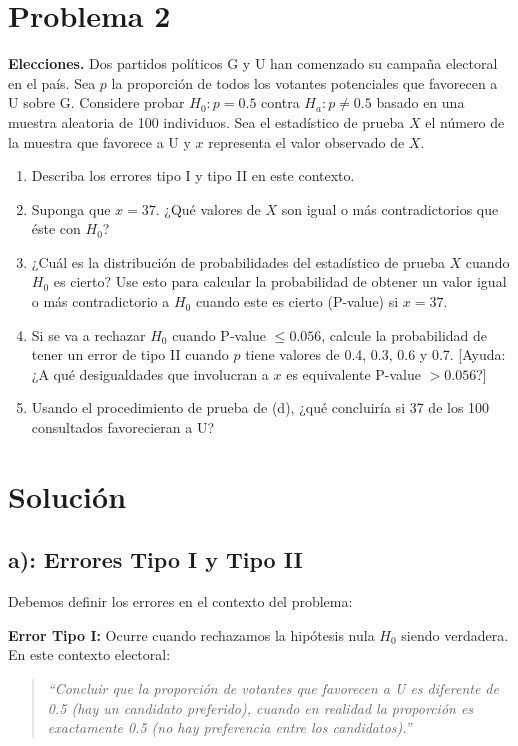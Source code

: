 \documentclass[12pt]{article}
\begin{document}
\section*{Problema 2}

\textbf{Elecciones.} Dos partidos políticos G y U han comenzado su campaña electoral en el país. Sea $p$ la proporción de todos los votantes potenciales que favorecen a U sobre G. Considere probar $H_0: p = 0.5$ contra $H_a: p \neq 0.5$ basado en una muestra aleatoria de 100 individuos. Sea el estadístico de prueba $X$ el número de la muestra que favorece a U y $x$ representa el valor observado de $X$.

\begin{enumerate}
    \item[a)] Describa los errores tipo I y tipo II en este contexto.
    \item[b)] Suponga que $x = 37$. ¿Qué valores de $X$ son igual o más contradictorios que éste con $H_0$?
    \item[c)] ¿Cuál es la distribución de probabilidades del estadístico de prueba $X$ cuando $H_0$ es cierto? Use esto para calcular la probabilidad de obtener un valor igual o más contradictorio a $H_0$ cuando este es cierto (P-value) si $x = 37$.
    \item[d)] Si se va a rechazar $H_0$ cuando P-value $\leq 0.056$, calcule la probabilidad de tener un error de tipo II cuando $p$ tiene valores de 0.4, 0.3, 0.6 y 0.7. [Ayuda: ¿A qué desigualdades que involucran a $x$ es equivalente P-value $> 0.056$?]
    \item[e)] Usando el procedimiento de prueba de (d), ¿qué concluiría si 37 de los 100 consultados favorecieran a U?
\end{enumerate}

\section*{Solución}

\subsection*{a): Errores Tipo I y Tipo II}

Debemos definir los errores en el contexto del problema:

\textbf{Error Tipo I:} Ocurre cuando rechazamos la hipótesis nula $H_0$ siendo verdadera. En este contexto electoral:

\begin{quote}
    \textit{``Concluir que la proporción de votantes que favorecen a U es diferente de 0.5 (hay un candidato preferido), cuando en realidad la proporción es exactamente 0.5 (no hay preferencia entre los candidatos).''}
\end{quote}
\end{document}
